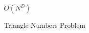 \documentclass[12pt,a4paper]{article}
\begin{document}
    \begin{figure}[!hbtp]
        \centering
        \caption{$O(N^{D})$}
    \end{figure}

    \begin{figure}[!hbtp]
        \centering
        \caption{Triangle Numbers Problem}
    \end{figure}
\end{document}
